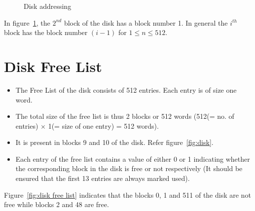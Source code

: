 \begin{figure}[htp!] 
	\centering
	\caption{Disk addressing}
	\label{fig:disk addr}
\end{figure}

\begin{example}
	In figure~\ref{fig:disk addr}, the $2^{nd}$ block of the disk has a block number 1. In general the $i^{th}$ block has the block number $(i-1)$ for $1 \le n \le 512$. 
\end{example}

\section{Disk Free List}
\label{lbl:disklst}
\begin{itemize}
	\item  The Free List of the disk consists of 512 entries. Each entry is of size one word.
	\item  The total size of the free list is thus 2 blocks or 512 words (512(= no. of entries) $\times$ 1(= size of one entry) = 512 words).
	\item  It is present in blocks 9 and 10 of the disk. Refer figure~\ref{fig:disk}. 
	\item  Each entry of the free list contains a value of either 0 or 1 indicating whether the corresponding block in the disk is free or not respectively (It should be ensured that the first 13 entries are always marked used).
\end{itemize}
\begin{example}
	Figure~\ref{fig:disk free list} indicates that the blocks 0, 1 and 511 of the disk are not free while blocks 2 and 48 are free.
\end{example}

